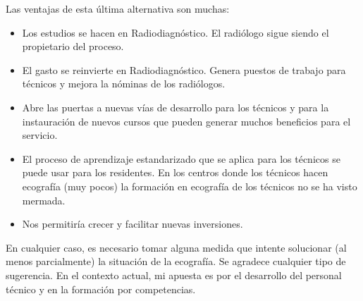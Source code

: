 \documentclass[]{article}
\providecommand{\tightlist}{%
  \setlength{\itemsep}{0pt}\setlength{\parskip}{0pt}}
\begin{document}
Las ventajas de esta última alternativa son muchas:

\begin{itemize}
\tightlist
\item
  Los estudios se hacen en Radiodiagnóstico. El radiólogo sigue siendo el propietario del proceso.
\item
  El gasto se reinvierte en Radiodiagnóstico. Genera puestos de trabajo para técnicos y mejora la nóminas de los radiólogos.
\item
  Abre las puertas a nuevas vías de desarrollo para los técnicos y para la instauración de nuevos cursos que pueden generar muchos beneficios para el servicio.
\item
  El proceso de aprendizaje estandarizado que se aplica para los técnicos se puede usar para los residentes. En los centros donde los técnicos hacen ecografía (muy pocos) la formación en ecografía de los técnicos no se ha visto mermada.
\item
  Nos permitiría crecer y facilitar nuevas inversiones.
\end{itemize}

En cualquier caso, es necesario tomar alguna medida que intente solucionar (al menos parcialmente) la situación de la ecografía. Se agradece cualquier tipo de sugerencia. En el contexto actual, mi apuesta es por el desarrollo del personal técnico y en la formación por competencias.


\end{document}
